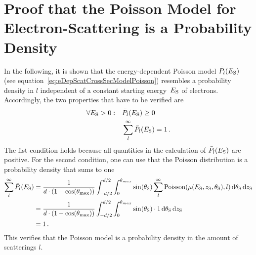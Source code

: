 \section{Proof that the Poisson Model for Electron-Scattering is a Probability Density}
\label{sec:appendixEDepScatCrossSecPoissonModelProbDensityProof}
In the following, it is shown that the energy-dependent Poisson model $\bar{P}_l(E_\mathrm{S})$ (see equation~\ref{eq:eDepScatCrossSecModelPoisson}) resembles a probability density in $l$ independent of a constant starting energy~$E_\mathrm{S}$ of electrons. Accordingly, the two properties that have to be verified are
\begin{align}
\forall E_\mathrm{S} > 0: \quad
&\bar{P}_l(E_\mathrm{S}) \geq 0 \\
&\sum_{l}^{\infty} \bar{P}_l(E_\mathrm{S}) = 1
\text{\,.}
\end{align}
The fist condition holds because all quantities in the calculation of $\bar{P}_l(E_\mathrm{S})$ are positive. For the second condition, one can use that the Poisson distribution is a probability density that sums to one
\begin{align*}
\sum_{l}^{\infty} \bar{P}_l(E_\mathrm{S}) &=
\frac{1}{d \cdot (1-\cos(\theta_\mathrm{max}))} 
\int_{-d/2}^{d/2}  
\int_{0}^{\theta_{max}} 
\sin(\theta_\mathrm{S})
\sum_{l}^{\infty}
\mathrm{Poisson}(\mu(E_\mathrm{S},z_\mathrm{S},\theta_\mathrm{S}),l)
\mathop{}\!\mathrm{d}\theta_\mathrm{S}
\mathop{}\!\mathrm{d}z_\mathrm{S} \\  &=
\frac{1}{d \cdot (1-\cos(\theta_\mathrm{max}))} 
\int_{-d/2}^{d/2}  
\int_{0}^{\theta_{max}} 
\sin(\theta_\mathrm{S})
\cdot 1
\mathop{}\!\mathrm{d}\theta_\mathrm{S}
\mathop{}\!\mathrm{d}z_\mathrm{S} \\ &= 1
\text{\,.}
\end{align*}
This verifies that the Poisson model is a probability density in the amount of scatterings $l$.
\clearpage

